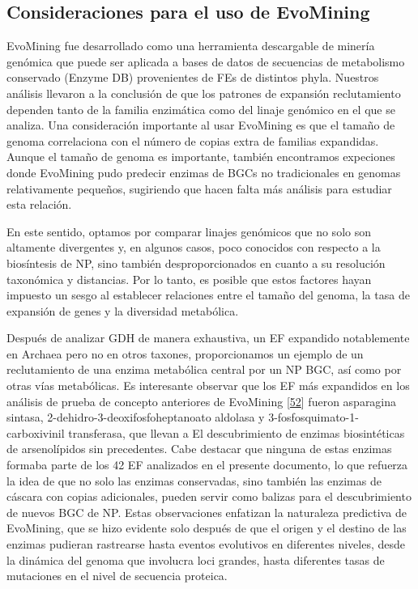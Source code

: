 \documentclass[12pt,twoside]{reedthesis}
\begin{document}
  \subsection{Consideraciones para el uso de
  EvoMining}\label{consideraciones-para-el-uso-de-evomining}
  
  EvoMining fue desarrollado como una herramienta descargable de minería
  genómica que puede ser aplicada a bases de datos de secuencias de
  metabolismo conservado (Enzyme DB) provenientes de FEs de distintos
  phyla. Nuestros análisis llevaron a la conclusión de que los patrones de
  expansión reclutamiento dependen tanto de la familia enzimática como del
  linaje genómico en el que se analiza. Una consideración importante al
  usar EvoMining es que el tamaño de genoma correlaciona con el número de
  copias extra de familias expandidas. Aunque el tamaño de genoma es
  importante, también encontramos expeciones donde EvoMining pudo predecir
  enzimas de BGCs no tradicionales en genomas relativamente pequeños,
  sugiriendo que hacen falta más análisis para estudiar esta relación.
  
  En este sentido, optamos por comparar linajes genómicos que no solo son
  altamente divergentes y, en algunos casos, poco conocidos con respecto a
  la biosíntesis de NP, sino también desproporcionados en cuanto a su
  resolución taxonómica y distancias. Por lo tanto, es posible que estos
  factores hayan impuesto un sesgo al establecer relaciones entre el
  tamaño del genoma, la tasa de expansión de genes y la diversidad
  metabólica.
  
  Después de analizar GDH de manera exhaustiva, un EF expandido
  notablemente en Archaea pero no en otros taxones, proporcionamos un
  ejemplo de un reclutamiento de una enzima metabólica central por un NP
  BGC, así como por otras vías metabólicas. Es interesante observar que
  los EF más expandidos en los análisis de prueba de concepto anteriores
  de EvoMining
  {[}\protect\hyperlink{ref-cruz-morales_phylogenomic_2016}{52}{]} fueron
  asparagina sintasa, 2-dehidro-3-deoxifosfoheptanoato aldolasa y
  3-fosfosquimato-1-carboxivinil transferasa, que llevan a El
  descubrimiento de enzimas biosintéticas de arsenolípidos sin
  precedentes. Cabe destacar que ninguna de estas enzimas formaba parte de
  los 42 EF analizados en el presente documento, lo que refuerza la idea
  de que no solo las enzimas conservadas, sino también las enzimas de
  cáscara con copias adicionales, pueden servir como balizas para el
  descubrimiento de nuevos BGC de NP. Estas observaciones enfatizan la
  naturaleza predictiva de EvoMining, que se hizo evidente solo después de
  que el origen y el destino de las enzimas pudieran rastrearse hasta
  eventos evolutivos en diferentes niveles, desde la dinámica del genoma
  que involucra loci grandes, hasta diferentes tasas de mutaciones en el
  nivel de secuencia proteica.
  
\end{document}
